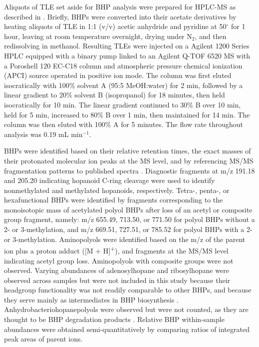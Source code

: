 Aliquots of TLE set aside for BHP analysis were prepared for HPLC-MS as described in \cite{talbot2003atmospheric}. Briefly, BHPs were converted into their acetate derivatives by heating aliquots of TLE in 1:1 (v/v) acetic anhydride and pyridine at 50$^{\circ}$ for 1 hour, leaving at room temperature overnight, drying under N$_2$, and then redissolving in methanol. Resulting TLEs were injected on a Agilent 1200 Series HPLC equipped with a binary pump linked to an Agilent Q-TOF 6520 MS with a Poroshell 120 EC-C18 column and atmospheric pressure chemical ionization (APCI) source operated in positive ion mode. The column was first eluted isocratically with 100\% solvent A (95:5 MeOH:water) for 2 min, followed by a linear gradient to 20\% solvent B (isopropanol) for 18 minutes, then held isocratically for 10 min. The linear gradient continued to 30\% B over 10 min, held for 5 min, increased to 80\% B over 1 min, then maintained for 14 min. The column was then eluted with 100\% A for 5 minutes. The flow rate throughout analysis was 0.19 mL min$^{-1}$.

BHPs were identified based on their relative retention times, the exact masses of their protonated molecular ion peaks at the MS level, and by referencing MS/MS fragmentation patterns to published spectra \citep{talbot2005bacteriohopanepolyols, talbot2007rapid, talbot2007structural, talbot2003atmospheric, talbot2003characteristic, talbot2008cyanobacterial}. Diagnostic fragments at m/z 191.18 and 205.20 indicating hopanoid C-ring cleavage were used to identify nonmethylated and methylated hopanoids, respectively. Tetra-, penta-, or hexafunctional BHPs were identified by fragments corresponding to the monoisotopic mass of acetylated polyol BHPs after loss of an acetyl or composite group fragment, namely: m/z 655.49, 713.50, or 771.50 for polyol BHPs without a 2- or 3-methylation, and m/z 669.51, 727.51, or 785.52 for polyol BHPs with a 2- or 3-methylation. Aminopolyols were identified based on the m/z of the parent ion plus a proton adduct ([M + H]\textsuperscript{+}), and fragments at the MS/MS level indicating acetyl group loss. Aminopolyols with composite groups were not observed. Varying abundances of adenosylhopane and ribosylhopane were observed across samples but were not included in this study because their headgroup functionality was not readily comparable to other BHPs, and because they serve mainly as intermediates in BHP biosynthesis \citep{bradley2010adenosylhopane, liu2014ribosylhopane}. Anhydrobacteriohopanepolyols were observed but were not counted, as they are thought to be BHP degradation products \citep{talbot2005bacteriohopanepolyols, schaeffer2008acid}. Relative BHP within-sample abundances were obtained semi-quantitatively by comparing ratios of integrated peak areas of parent ions.



